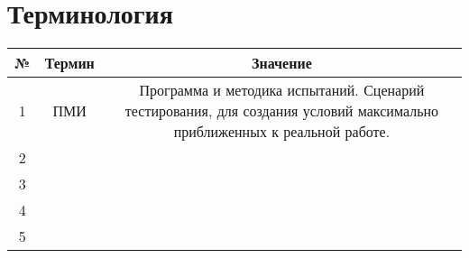 \section{Терминология}

\begin{tabular}{|c|c|c|}
	\hline
	№ & Термин & Значение \\
	\hline
	1 & ПМИ & Программа и методика испытаний. Сценарий тестирования, для создания условий максимально приближенных к реальной работе. \\
	\hline
	2 &  &  \\
	\hline
	3 &  &  \\
	\hline
	4 &  &  \\
	\hline
	5 &  &  \\
	\hline
\end{tabular}